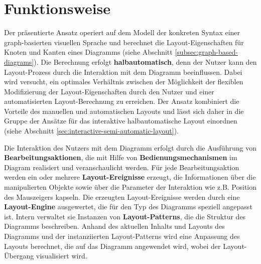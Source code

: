 \begin{enumerate}[label={K.\arabic*}]
\end{enumerate}


\section{Funktionsweise}
\label{sec:functionality}

Der präsentierte Ansatz operiert auf dem Modell der konkreten Syntax einer graph-basierten visuellen Sprache und berechnet die Layout-Eigenschaften für Knoten und Kanten eines Diagramms (siehe Abschnitt \ref{subsec:graph-based-diagrams}). Die Berechnung erfolgt \textbf{halbautomatisch}, denn der Nutzer kann den Layout-Prozess durch die Interaktion mit dem Diagramm beeinflussen. Dabei wird versucht, ein optimales Verhältnis zwischen der Möglichkeit der flexiblen Modifizierung der Layout-Eigenschaften durch den Nutzer und einer automatisierten Layout-Berechnung zu erreichen. Der Ansatz kombiniert die Vorteile des manuellen und automatischen Layouts und lässt sich daher in die Gruppe der Ansätze für das interaktive halbautomatische Layout einordnen (siehe Abschnitt \ref{sec:interactive-semi-automatic-layout}).

Die Interaktion des Nutzers mit dem Diagramm erfolgt durch die Ausführung von \textbf{Bearbeitungsaktionen}, die mit Hilfe von \textbf{Bedienungsmechanismen} im Diagram realisiert und veranschaulicht werden. Für jede Bearbeitungsaktion werden ein oder mehrere \textbf{Layout-Ereignisse} erzeugt, die Informationen über die manipulierten Objekte sowie über die Parameter der Interaktion wie z.B. Position des Mauszeigers kapseln. Die erzeugten Layout-Ereignisse werden durch eine \textbf{Layout-Engine} ausgewertet, die für den Typ des Diagramms speziell angepasst ist. Intern verwaltet sie Instanzen von \textbf{Layout-Patterns}, die die Struktur des Diagramms beschreiben. Anhand des aktuellen Inhalts und Layouts des Diagramms und der instanziierten Layout-Patterns wird eine Anpassung des Layouts berechnet, die auf das Diagramm angewendet wird, wobei der Layout-Übergang visualisiert wird.



